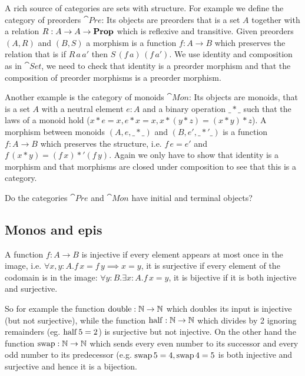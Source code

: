 A rich source of categories are sets with structure. For example we define the category of preorders $\cat{Pre}$: Its objects are preorders that is a set $A$ together with a relation $R : A \to A \to \mathbf{Prop}$ which is reflexive and transitive. Given preorders $(A,R)$ and $(B,S)$ a morphism is a function $f : A \to B$ which preserves the relation that is if $R\,a\,a'$ then $S\,(f\,a)\,(f\,a')$. We use identity and composition as in $\cat{Set}$, we need to check that identity is a preorder morphism and that the composition of preorder morphisms is a preorder morphism.

Another example is the category of monoids $\cat{Mon}$: Its objects are monoids, that is a set $A$ with a neutral element $e:A$ and a binary operation $\_*\_$ such that the laws of a monoid hold ($x*e=x, e*x=x, x*(y*z) = (x*y)*z$). A morphism between monoids $(A,e, \_*\_)$ and $(B,e',\_*'\_)$ is a function $f : A \to B$ which preserves the structure, i.e. $f\,e = e'$ and $f\,(x * y) = (f\,x) *' (f\, y)$. Again we only have to show that identity is a morphism and that morphisms are closed under composition to see that this is a category.

\begin{question}
  Do the categories $\cat{Pre}$ and $\cat{Mon}$ have initial and terminal objects?
\end{question}

\subsection{Monos and epis}
\label{sec:monos-epis}

A function $f:A\to B$ is injective if every element appears at most once in the image, i.e. $\forall x,y:A.f\,x = f\,y \implies x = y$, it is surjective if every element of the codomain is in the image: $\forall y:B.\exists x:A.f\,x = y$, it is bijective if it is both injective and surjective. 

So for example the function $\mathrm{double} : \mathbb{N} \to \mathbb{N}$ which doubles its input is injective (but not surjective), while the function $\mathrm{half} : \mathbb{N} \to \mathbb{N}$ which divides by 2 ignoring remainders (eg. $\mathrm{half}\,5 = 2$) is surjective but not injective. On the other hand the function $\mathrm{swap} : \mathbb{N} \to \mathbb{N}$ which sends every even number to its successor and every odd number to its predecessor (e.g. $\mathrm{swap}\,5 = 4, \mathrm{swap}\,4 = 5$ is both injective and surjective and hence it is a bijection.  


